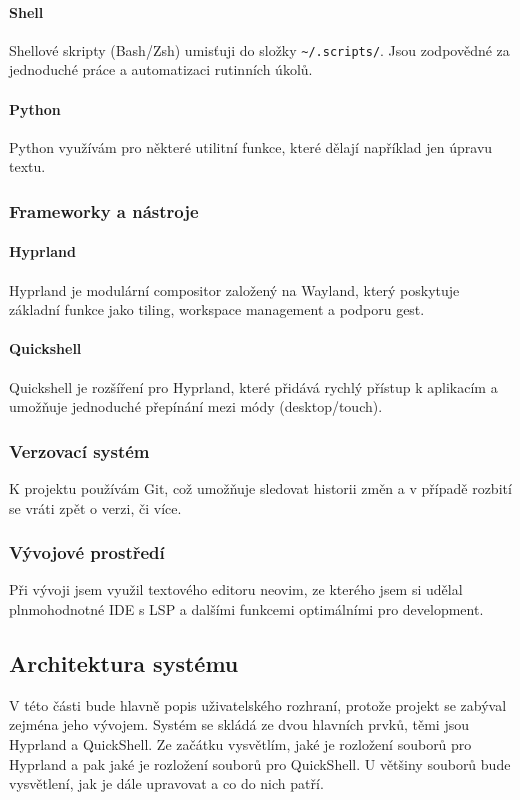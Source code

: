 \documentclass[12pt,a4paper]{article}
\begin{document}
\paragraph{Shell}
Shellové skripty (Bash/Zsh) umisťuji do složky \texttt{\textasciitilde/.scripts/}. Jsou zodpovědné za jednoduché
práce a automatizaci rutinních úkolů. 

\paragraph{Python}
Python využívám pro některé utilitní funkce, které dělají například jen úpravu textu.

\subsubsection{Frameworky a nástroje}
\paragraph{Hyprland}
Hyprland je modulární compositor založený na Wayland, který poskytuje základní funkce jako tiling, workspace management
a podporu gest. \autocite{HyprlandWiki2026}

\paragraph{Quickshell}
Quickshell je rozšíření pro Hyprland, které přidává rychlý přístup k aplikacím a umožňuje jednoduché přepínání mezi
módy (desktop/touch). \autocite{Quickshell}

\subsubsection{Verzovací systém}
K projektu používám Git, což umožňuje sledovat historii změn a v případě rozbití se vráti zpět o verzi, či více.

\subsubsection{Vývojové prostředí}
Při vývoji jsem využil textového editoru neovim, ze kterého jsem si udělal plnmohodnotné IDE s LSP a dalšími funkcemi
optimálními pro development. \autocite{Neovim}


\subsection{Architektura systému}
V této části bude hlavně popis uživatelského rozhraní, protože projekt se zabýval zejména jeho vývojem.
Systém se skládá ze dvou hlavních prvků, těmi jsou Hyprland a QuickShell. Ze začátku vysvětlím, jaké je rozložení
souborů pro Hyprland a pak jaké je rozložení souborů pro QuickShell. U většiny souborů bude vysvětlení, jak je dále
upravovat a co do nich patří.
\end{document}
